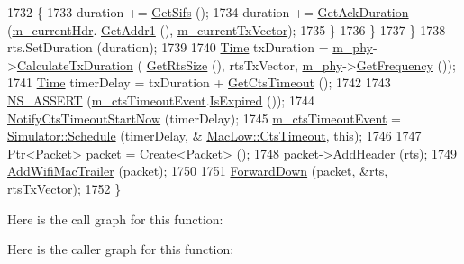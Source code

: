 \begin{DoxyCode}
1732             \{
1733               duration += \hyperlink{classns3_1_1MacLow_a9107421b7ed9f291d60b8344b4918e56}{GetSifs} ();
1734               duration += \hyperlink{classns3_1_1MacLow_afb6684c2fedc5d0595a80b0f6e959065}{GetAckDuration} (\hyperlink{classns3_1_1MacLow_aec9902bc8026338baf261d2de8fcd83b}{m\_currentHdr}.
      \hyperlink{classns3_1_1WifiMacHeader_a5ddcfd82e7c5a17ffea5be9246544530}{GetAddr1} (), \hyperlink{classns3_1_1MacLow_af87bd81ded4d362f9f1dc89dbbee65a3}{m\_currentTxVector});
1735             \}
1736         \}
1737     \}
1738   rts.SetDuration (duration);
1739 
1740   \hyperlink{namespacens3_1_1TracedValueCallback_a7ffd3e7c142ffe7c8a1d2db9b8de38ec}{Time} txDuration = \hyperlink{classns3_1_1MacLow_aec8aefec9501f9d7c06b6cd0ee1353ee}{m\_phy}->\hyperlink{classns3_1_1WifiPhy_aee98c7241bb4f0bb8e6d90f5771dacc7}{CalculateTxDuration} (
      \hyperlink{classns3_1_1MacLow_a2eca2a2e6be1438bedbe85034acf5a2c}{GetRtsSize} (), rtsTxVector, \hyperlink{classns3_1_1MacLow_aec8aefec9501f9d7c06b6cd0ee1353ee}{m\_phy}->\hyperlink{classns3_1_1WifiPhy_ad2508d94faf22d690d6b8b4367934fd1}{GetFrequency} ());
1741   \hyperlink{namespacens3_1_1TracedValueCallback_a7ffd3e7c142ffe7c8a1d2db9b8de38ec}{Time} timerDelay = txDuration + \hyperlink{classns3_1_1MacLow_aba3db8af06fbd9e80a0d6c35dc1f3cf4}{GetCtsTimeout} ();
1742 
1743   \hyperlink{assert_8h_a6dccdb0de9b252f60088ce281c49d052}{NS\_ASSERT} (\hyperlink{classns3_1_1MacLow_a1de3cc66dcaa9f318fb1b2cffb108b01}{m\_ctsTimeoutEvent}.\hyperlink{classns3_1_1EventId_a5c30c92e7c1c34b4e8505cc07ed71b02}{IsExpired} ());
1744   \hyperlink{classns3_1_1MacLow_ad4e0eee50d12b8b7e22ad6b68ffb82ef}{NotifyCtsTimeoutStartNow} (timerDelay);
1745   \hyperlink{classns3_1_1MacLow_a1de3cc66dcaa9f318fb1b2cffb108b01}{m\_ctsTimeoutEvent} = \hyperlink{classns3_1_1Simulator_a671882c894a08af4a5e91181bf1eec13}{Simulator::Schedule} (timerDelay, &
      \hyperlink{classns3_1_1MacLow_a35adb9b4c7f1035da2cb080289ba9cf7}{MacLow::CtsTimeout}, \textcolor{keyword}{this});
1746 
1747   Ptr<Packet> packet = Create<Packet> ();
1748   packet->AddHeader (rts);
1749   \hyperlink{classns3_1_1MacLow_acaafc67755f16f347e9161310d71e3ef}{AddWifiMacTrailer} (packet);
1750 
1751   \hyperlink{classns3_1_1MacLow_a4eefbfa3d57539dadf0224cc7fcf952d}{ForwardDown} (packet, &rts, rtsTxVector);
1752 \}
\end{DoxyCode}


Here is the call graph for this function\+:




Here is the caller graph for this function\+:


